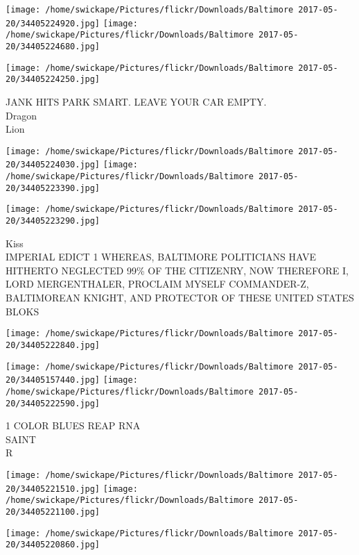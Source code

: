 \documentclass[10pt,letterpaper]{article}
\begin{document}
\texttt{[image: /home/swickape/Pictures/flickr/Downloads/Baltimore 2017-05-20/34405224920.jpg]}
\texttt{[image: /home/swickape/Pictures/flickr/Downloads/Baltimore 2017-05-20/34405224680.jpg]}

\vspace{0.25in}
\texttt{[image: /home/swickape/Pictures/flickr/Downloads/Baltimore 2017-05-20/34405224250.jpg]}

JANK HITS PARK SMART. LEAVE YOUR CAR EMPTY.\\
Dragon\\
Lion\\
\pagebreak

\texttt{[image: /home/swickape/Pictures/flickr/Downloads/Baltimore 2017-05-20/34405224030.jpg]}
\texttt{[image: /home/swickape/Pictures/flickr/Downloads/Baltimore 2017-05-20/34405223390.jpg]}

\vspace{0.25in}
\texttt{[image: /home/swickape/Pictures/flickr/Downloads/Baltimore 2017-05-20/34405223290.jpg]}

Kiss\\
IMPERIAL EDICT 1 WHEREAS, BALTIMORE POLITICIANS HAVE HITHERTO NEGLECTED 99\% OF THE CITIZENRY, NOW THEREFORE I, LORD MERGENTHALER, PROCLAIM MYSELF COMMANDER{-}Z, BALTIMOREAN KNIGHT, AND PROTECTOR OF THESE UNITED STATES\\
BLOKS\\
\pagebreak

\texttt{[image: /home/swickape/Pictures/flickr/Downloads/Baltimore 2017-05-20/34405222840.jpg]}

\vspace{0.25in}
\texttt{[image: /home/swickape/Pictures/flickr/Downloads/Baltimore 2017-05-20/34405157440.jpg]}
\texttt{[image: /home/swickape/Pictures/flickr/Downloads/Baltimore 2017-05-20/34405222590.jpg]}

1 COLOR BLUES REAP RNA\\
SAINT\\
R\\
\pagebreak

\texttt{[image: /home/swickape/Pictures/flickr/Downloads/Baltimore 2017-05-20/34405221510.jpg]}
\texttt{[image: /home/swickape/Pictures/flickr/Downloads/Baltimore 2017-05-20/34405221100.jpg]}

\vspace{0.25in}
\texttt{[image: /home/swickape/Pictures/flickr/Downloads/Baltimore 2017-05-20/34405220860.jpg]}
\end{document}
